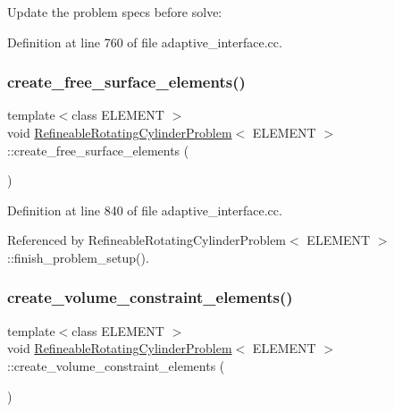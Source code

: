 Update the problem specs before solve\+: 



Definition at line 760 of file adaptive\+\_\+interface.\+cc.

\mbox{\label{classRefineableRotatingCylinderProblem_a57623d36f2c97d300215c00ac917d449}} 
\subsubsection{\texorpdfstring{create\+\_\+free\+\_\+surface\+\_\+elements()}{create\_free\_surface\_elements()}}
{\footnotesize\ttfamily template$<$class E\+L\+E\+M\+E\+NT $>$ \\
void \hyperlink{classRefineableRotatingCylinderProblem}{Refineable\+Rotating\+Cylinder\+Problem}$<$ E\+L\+E\+M\+E\+NT $>$\+::create\+\_\+free\+\_\+surface\+\_\+elements (\begin{DoxyParamCaption}{ }\end{DoxyParamCaption})\hspace{0.3cm}{\ttfamily [inline]}}



Definition at line 840 of file adaptive\+\_\+interface.\+cc.



Referenced by Refineable\+Rotating\+Cylinder\+Problem$<$ E\+L\+E\+M\+E\+N\+T $>$\+::finish\+\_\+problem\+\_\+setup().

\mbox{\label{classRefineableRotatingCylinderProblem_a2de094b437cba9e9b71dca0afe587d65}} 
\subsubsection{\texorpdfstring{create\+\_\+volume\+\_\+constraint\+\_\+elements()}{create\_volume\_constraint\_elements()}}
{\footnotesize\ttfamily template$<$class E\+L\+E\+M\+E\+NT $>$ \\
void \hyperlink{classRefineableRotatingCylinderProblem}{Refineable\+Rotating\+Cylinder\+Problem}$<$ E\+L\+E\+M\+E\+NT $>$\+::create\+\_\+volume\+\_\+constraint\+\_\+elements (\begin{DoxyParamCaption}{ }\end{DoxyParamCaption})\hspace{0.3cm}{\ttfamily [inline]}}




